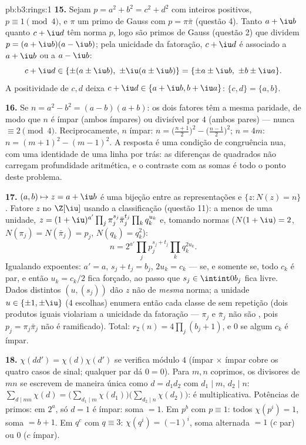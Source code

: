 \begin{solution}{pb:b3:rings:1}
\textbf{15.} Sejam $p = a^2 + b^2 = c^2 + d^2$ com inteiros positivos, $p \equiv 1 \pmod 4$, e $\pi$ um
primo de Gauss com $p = \pi\bar\pi$ (questão 4). Tanto $a + \iu b$ quanto $c + \iu d$ têm norma
$p$, logo são primos de Gauss (questão 2) que dividem $p = (a+\iu b)(a - \iu b)$; pela
unicidade da fatoração, $c +
\iu d$ é associado a $a + \iu b$ ou a $a - \iu b$:
\[
c + \iu d \in \{\pm(a \pm \iu b),\ \pm\iu(a \pm \iu b)\}
= \{\pm a \pm \iu b,\ \pm b \pm \iu a\}.
\]
A positividade de $c, d$ deixa $c + \iu d \in \{a + \iu b, b + \iu
a\}$: $\{c, d\} = \{a, b\}$.

\textbf{16.} Se $n = a^2 - b^2 = (a-b)(a+b)$: os dois fatores têm a mesma paridade, de modo que
$n$ é ímpar (ambos ímpares) ou divisível por $4$ (ambos pares)
--- nunca $\equiv 2 \pmod 4$. Reciprocamente, $n$ ímpar: $n = \bigl(\frac{n+1}2\bigr)^2 -
\bigl(\frac{n-1}2\bigr)^2$; $n = 4m$:
$n = (m+1)^2 - (m-1)^2$. A resposta é uma condição de congruência nua, com uma identidade
de uma linha por trás: as diferenças de quadrados não carregam
profundidade aritmética, e o contraste com as somas é todo o ponto deste
problema.

\textbf{17.} $(a, b) \mapsto z = a + \iu b$ é uma bijeção entre as representações e $\{z : N(z) = n\}$. Fatore
$z$ no  $\Z[\iu]$ usando a classificação (questão 11): a menos de uma
unidade, $z = (1+\iu)^{a'}\prod_j\pi_j^{s_j}\bar\pi_j^{t_j}
\prod_kq_k^{u_k}$ e, tomando normas ($N(1+\iu) = 2$, $N(\pi_j) = N(\bar\pi_j) = p_j$, $N(q_k) = q_k^2$):
\[
n = 2^{a'}\prod_jp_j^{s_j + t_j}\prod_kq_k^{2u_k} .
\]
Igualando expoentes: $a' = a$, $s_j + t_j = b_j$, $2u_k = c_k$ ---  se, e somente
se, todo $c_k$ é par, e então $u_k = c_k/2$ fica forçado, ao passo que $s_j \in \intint0{b_j}$
fica livre. Dados distintos $(u, (s_j))$ dão $z$ não  de
\emph{mesma} norma; a unidade $u \in \{\pm1, \pm\iu\}$ (4 escolhas) enumera então cada
classe de  sem repetição (dois produtos iguais violariam a
unicidade da fatoração --- $\pi_j$ e $\bar\pi_j$ não são , pois
$p_j =
\pi_j\bar\pi_j$ não é ramificado). Total: $r_2(n) =
4\prod_j(b_j + 1)$, e $0$ se algum $c_k$ é
ímpar.

\textbf{18.} $\chi(dd') = \chi(d)\chi(d')$ se verifica módulo $4$ (ímpar $\times$ ímpar
cobre os quatro casos de sinal; qualquer par dá $0 = 0$). Para
$m, n$ coprimos, os divisores de $mn$ se escrevem de maneira
única como $d = d_1d_2$ com $d_1 \mid m$, $d_2 \mid n$: $\sum_{d \mid mn}\chi(d) = \bigl(\sum_{d_1\mid
m}\chi(d_1)\bigr)\bigl(\sum_{d_2\mid n}\chi(d_2)\bigr)$: é multiplicativa. Potências de
primos: em $2^a$, só $d = 1$ é ímpar: soma $= 1$. Em $p^b$
com $p \equiv 1$: todos $\chi(p^i) = 1$, soma $= b + 1$. Em $q^c$ com $q \equiv 3$: $\chi(q^i) =
(-1)^i$, soma
alternada $= 1$ ($c$ par) ou $0$ ($c$ ímpar).


\end{solution}

